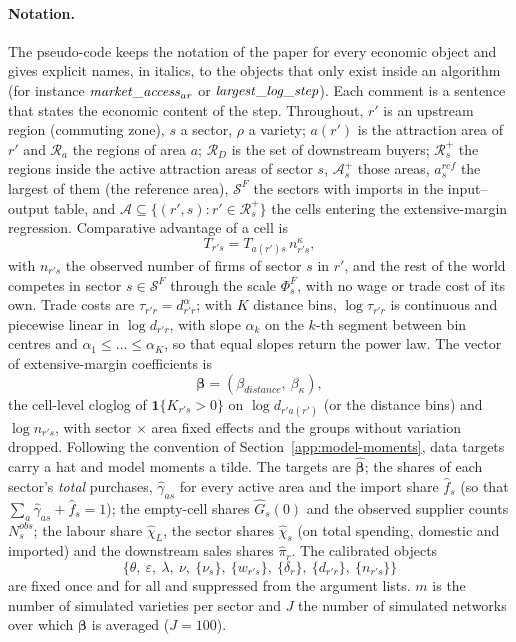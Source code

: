 \paragraph{Notation.} The pseudo-code keeps the notation of the paper for every economic object and gives explicit names, in italics, to the objects that only exist inside an algorithm (for instance $\mathit{market\_access}_{ar}$ or $\mathit{largest\_log\_step}$). Each comment is a sentence that states the economic content of the step. Throughout, $r'$ is an upstream region (commuting zone), $s$ a sector, $\rho$ a variety; $a(r')$ is the attraction area of $r'$ and $\mathcal{R}_a$ the regions of area $a$; $\mathcal{R}_D$ is the set of downstream buyers; $\mathcal{R}^+_s$ the regions inside the active attraction areas of sector $s$, $\mathcal{A}^+_s$ those areas, $a^{ref}_s$ the largest of them (the reference area), $\mathcal{S}^F$ the sectors with imports in the input--output table, and $\mathcal{A}\subseteq\{(r',s): r'\in\mathcal{R}^+_s\}$ the cells entering the extensive-margin regression. Comparative advantage of a cell is
$$
T_{r's}=T_{a(r')s}\,n_{r's}^{\kappa},
$$
with $n_{r's}$ the observed number of firms of sector $s$ in $r'$, and the rest of the world competes in sector $s\in\mathcal{S}^F$ through the scale $\Phi^F_s$, with no wage or trade cost of its own. Trade costs are $\tau_{r'r}=d_{r'r}^{\alpha}$; with $K$ distance bins, $\log\tau_{r'r}$ is continuous and piecewise linear in $\log d_{r'r}$, with slope $\alpha_k$ on the $k$-th segment between bin centres and $\alpha_1\le\dots\le\alpha_K$, so that equal slopes return the power law. The vector of extensive-margin coefficients is
$$
\boldsymbol\beta=(\beta_{distance},\ \beta_\kappa),
$$
the cell-level cloglog of $\mathbf{1}\{K_{r's}>0\}$ on $\log d_{r'a(r')}$ (or the distance bins) and $\log n_{r's}$, with sector $\times$ area fixed effects and the groups without variation dropped. Following the convention of Section~\ref{app:model-moments}, data targets carry a hat and model moments a tilde. The targets are $\hat{\boldsymbol\beta}$; the shares of each sector's \emph{total} purchases, $\hat\gamma_{as}$ for every active area and the import share $\hat f_s$ (so that $\sum_{a}\hat\gamma_{as}+\hat f_s=1$); the empty-cell shares $\hat G_s(0)$ and the observed supplier counts $N^{obs}_s$; the labour share $\hat\chi_L$, the sector shares $\hat\chi_s$ (on total spending, domestic and imported) and the downstream sales shares $\hat\pi_r$. The calibrated objects
$$
  \bigl\{\theta,\ \varepsilon,\ \lambda,\ \nu,\ \{\nu_s\},\
  \{w_{r's}\},\ \{\delta_r\},\ \{d_{r'r}\},\ \{n_{r's}\}\bigr\}
$$
are fixed once and for all and suppressed from the argument lists. $m$ is the number of simulated varieties per sector and $J$ the number of simulated networks over which $\boldsymbol\beta$ is averaged ($J=100$).

